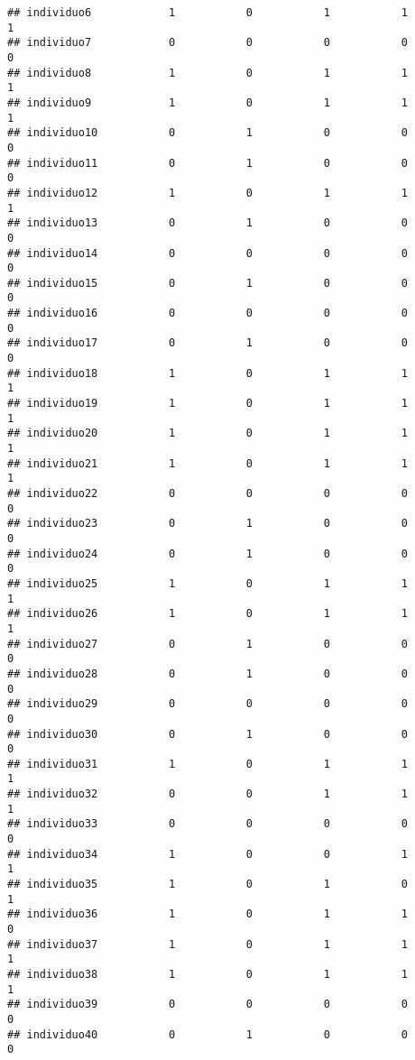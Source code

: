 \documentclass[
]{article}
\begin{document}
\begin{verbatim}
## individuo6            1           0           1           1           1
## individuo7            0           0           0           0           0
## individuo8            1           0           1           1           1
## individuo9            1           0           1           1           1
## individuo10           0           1           0           0           0
## individuo11           0           1           0           0           0
## individuo12           1           0           1           1           1
## individuo13           0           1           0           0           0
## individuo14           0           0           0           0           0
## individuo15           0           1           0           0           0
## individuo16           0           0           0           0           0
## individuo17           0           1           0           0           0
## individuo18           1           0           1           1           1
## individuo19           1           0           1           1           1
## individuo20           1           0           1           1           1
## individuo21           1           0           1           1           1
## individuo22           0           0           0           0           0
## individuo23           0           1           0           0           0
## individuo24           0           1           0           0           0
## individuo25           1           0           1           1           1
## individuo26           1           0           1           1           1
## individuo27           0           1           0           0           0
## individuo28           0           1           0           0           0
## individuo29           0           0           0           0           0
## individuo30           0           1           0           0           0
## individuo31           1           0           1           1           1
## individuo32           0           0           1           1           1
## individuo33           0           0           0           0           0
## individuo34           1           0           0           1           1
## individuo35           1           0           1           0           1
## individuo36           1           0           1           1           0
## individuo37           1           0           1           1           1
## individuo38           1           0           1           1           1
## individuo39           0           0           0           0           0
## individuo40           0           1           0           0           0

\end{verbatim}
\end{document}

